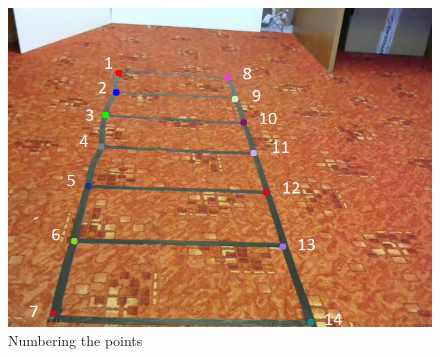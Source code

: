 \begin{figure}
\centering
\includegraphics[width=0.8\linewidth]{img/experiments/right-ladder-numbered.png}
\caption{Numbering the points}
\label{fig:ladder_numbered}
\end{figure}

